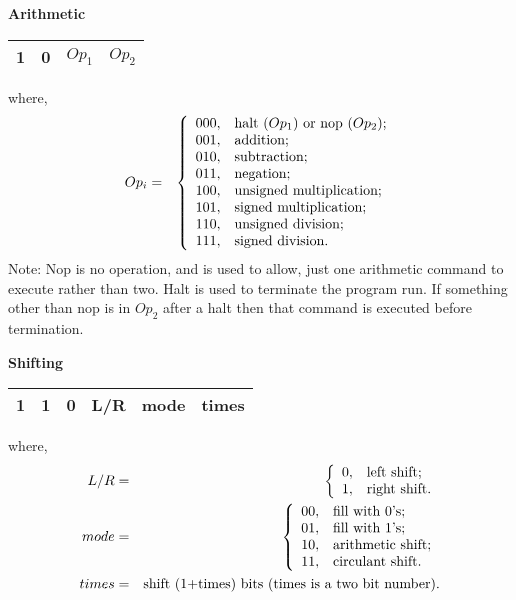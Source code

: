 \textbf{Arithmetic}

\begin{tabular}{|cc|c|c|}
\hline
  1 & 0 & $Op_1$ & $Op_2$ \\ \hline
\end{tabular}

where,
\begin{eqnarray*}
  Op_i &=& \left\{%
\begin{array}{ll}
    000, & \hbox{halt ($Op_1$) or nop ($Op_2$);} \\
    001, & \hbox{addition;} \\
    010, & \hbox{subtraction;} \\
    011, & \hbox{negation;} \\
    100, & \hbox{unsigned multiplication;} \\
    101, & \hbox{signed multiplication;} \\
    110, & \hbox{unsigned division;} \\
    111, & \hbox{signed division.} \\
\end{array}%
\right.
\end{eqnarray*}
Note: Nop is no operation, and is used to allow, just one arithmetic command to execute rather than two.  Halt is used to terminate the program run.  If something other than nop is in $Op_2$ after a halt then that command is executed before termination.


\textbf{Shifting}

\begin{tabular}{|cc|c|c|c|c|}
\hline
  1 & 1 & 0 & L/R & mode & times \\ \hline
\end{tabular}

where,
\begin{eqnarray*}
  L/R &=& \left\{%
\begin{array}{ll}
    0, & \hbox{left shift;} \\
    1, & \hbox{right shift.} \\
\end{array}%
\right. \\
  mode &=& \left\{%
\begin{array}{ll}
    00, & \hbox{fill with 0's;} \\
    01, & \hbox{fill with 1's;} \\
    10, & \hbox{arithmetic shift;} \\
    11, & \hbox{circulant shift.} \\
\end{array}%
\right. \\
times &=& \hbox{shift (1+times) bits (times is a two bit number).}
\end{eqnarray*}


